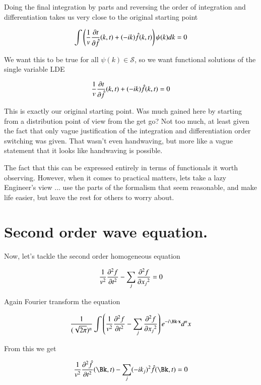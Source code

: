 \documentclass{article}
\newcommand{\PDSq}[2]{\frac{\partial^2 {#2}}{\partial {#1}^2}}
\newcommand{\Sw}[0]{\mathcal{S}}
\begin{document}
Doing the final integration by parts and reversing the order of integration and differentiation takes us very close to the original starting point

\begin{align*}
\int \left( \frac{1}{v} \frac{\partial{t}}{\partial {\hat{f}}}(k,t) + (-i k ) \hat{f}(k,t) \right) \psi(k) dk = 0
\end{align*}

We want this to be true for all $\psi(k) \in \Sw$, so we want functional solutions of the single variable LDE

\begin{align*}
\frac{1}{v} \frac{\partial{t}}{\partial {\hat{f}}}(k,t) + (-i k ) \hat{f}(k,t) = 0
\end{align*}

This is exactly our original starting point.  Was much gained here by starting from a distribution point of view from the get go?  Not too much, at least
given the fact that only vague justification of the integration and differentiation order switching was given.  That wasn't even handwaving, but more
like a vague statement that it looks like handwaving is possible.

The fact
that this can be expressed entirely in terms of functionals it worth observing.  However, when it comes to practical matters, lets take a lazy Engineer's view ... use the parts 
of the formalism that seem reasonable, and make life easier, but leave the rest for others to worry about. 

\section{ Second order wave equation. }

Now, let's tackle the second order homogeneous equation

\begin{align}\label{eqn:secondOrderWave}
\inv{v^2} \PDSq{t}{f} - \sum_j \PDSq{x_j}{f} = 0
\end{align}

Again Fourier transform the equation

\begin{align*}
\frac{1}{(\sqrt{2\pi})^n} \int \left( \inv{v^2} \PDSq{t}{f} - \sum_j \PDSq{x_j}{f} \right) e^{-i \Bk \cdot \Bx } d^n x \\
\end{align*}

From this we get 

\begin{align*}
\inv{v^2} \PDSq{t}{\hat{f}}(\Bk,t) - \sum_j (-i k_j)^2 \hat{f}(\Bk,t) = 0
\end{align*}
\end{document}
